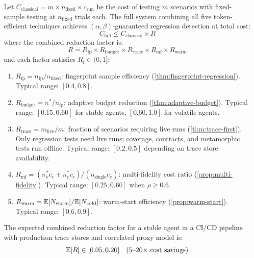 \begin{theorem}
\label{thm:combined-efficiency}
Let $C_{\mathrm{classical}} = m \times n_{\mathrm{fixed}} \times
c_{\mathrm{run}}$ be the cost of testing $m$ scenarios with fixed-sample
testing at $n_{\mathrm{fixed}}$ trials each. The full \agentassay{}
system combining all five token-efficient techniques achieves
$(\alpha, \beta)$-guaranteed regression detection at total cost:
\begin{equation}
\label{eq:combined-cost}
  C_{\mathrm{full}} \leq C_{\mathrm{classical}} \times R
\end{equation}
where the combined reduction factor is:
\begin{equation}
\label{eq:combined-R}
  R = R_{\mathrm{fp}} \times R_{\mathrm{budget}} \times
      R_{\mathrm{trace}} \times R_{\mathrm{mf}} \times
      R_{\mathrm{warm}}
\end{equation}
and each factor satisfies $R_i \in (0, 1]$:
\begin{enumerate}[leftmargin=*]
  \item $R_{\mathrm{fp}} = n_{\mathrm{fp}} / n_{\mathrm{fixed}}$:
    fingerprint sample efficiency (\cref{thm:fingerprint-regression}).
    Typical range: $[0.4, 0.8]$.

  \item $R_{\mathrm{budget}} = n^* / n_{\mathrm{fp}}$:
    adaptive budget reduction (\cref{thm:adaptive-budget}). Typical
    range: $[0.15, 0.60]$ for stable agents, $[0.60, 1.0]$ for
    volatile agents.

  \item $R_{\mathrm{trace}} = m_{\mathrm{live}} / m$:
    fraction of scenarios requiring live runs
    (\cref{thm:trace-first}). Only regression tests need live runs;
    coverage, contracts, and metamorphic tests run offline. Typical
    range: $[0.2, 0.5]$ depending on trace store availability.

  \item $R_{\mathrm{mf}} = (n_e^* c_e + n_c^* c_c) /
    (n_{\mathrm{single}} c_e)$:
    multi-fidelity cost ratio (\cref{prop:multi-fidelity}). Typical
    range: $[0.25, 0.60]$ when $\rho \geq 0.6$.

  \item $R_{\mathrm{warm}} = \mathbb{E}[N_{\mathrm{warm}}] /
    \mathbb{E}[N_{\mathrm{cold}}]$:
    warm-start efficiency (\cref{prop:warm-start}). Typical range:
    $[0.6, 0.9]$.
\end{enumerate}

The expected combined reduction factor for a stable agent in a CI/CD
pipeline with production trace stores and correlated proxy model is:
\begin{equation}
\label{eq:expected-R}
  \mathbb{E}[R] \in [0.05, 0.20]
  \quad\text{(5--20$\times$ cost savings)}
\end{equation}
\end{theorem}

